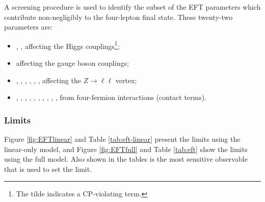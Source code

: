 A screening procedure is used to identify the subset of the EFT parameters which contribute non-negligibly to the four-lepton final state. These twenty-two parameters are:
\begin{itemize}
  \item \chg, \chgtil, \chdd affecting the Higgs couplings\footnote{The tilde indicates a CP-violating term.};
  \item \chwb affecting the gauge boson couplings;
  \item \chd, \chu, \che, \chlone, \chlthr, \chqone, \chqthr affecting the $Z\to \ell\ell$ vertex;
  \item \ced, \cee, \ceu, \cld, \cle, \cll, \cllone, \clqone, \clqthr, \clu, \cqe from four-fermion interactions (contact terms).
\end{itemize}

\subsubsection{Limits}
Figure \ref{fig:EFTlinear} and Table \ref{tab:eft-linear} present the limits using the linear-only model, and Figure \ref{fig:EFTfull} and Table \ref{tab:eft} show the limits using the full model. Also shown in the tables is the most sensitive observable that is used to set the limit.

